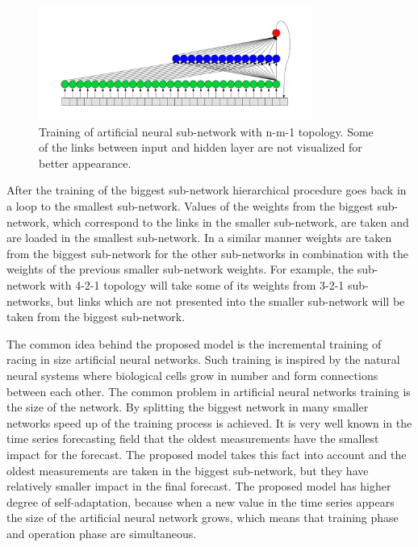 \documentclass[11pt]{article}
\begin{document}
\begin{figure}[ht!]
   \centering
     \includegraphics[width=0.8\textwidth]{pic03}
    \caption {Training of artificial neural sub-network with n-m-1 topology. Some of the links between input and hidden layer are not visualized for better appearance.}
\label{fig:pic03}
\end{figure}
\FloatBarrier

After the training of the biggest sub-network hierarchical procedure goes back in a loop to the smallest sub-network. Values of the weights from the biggest sub-network, which correspond to the links in the smaller sub-network, are taken and are loaded in the smallest sub-network. In a similar manner weights are taken from the biggest sub-network for the other sub-networks in combination with the weights of the previous smaller sub-network weights. For example, the sub-network with 4-2-1 topology will take some of its weights from 3-2-1 sub-networks, but links which are not presented into the smaller sub-network will be taken from the biggest sub-network. 

The common idea behind the proposed model is the incremental training of racing in size artificial neural networks. Such training is inspired by the natural neural systems where biological cells grow in number and form connections between each other. The common problem in artificial neural networks training is the size of the network. By splitting the biggest network in many smaller networks speed up of the training process is achieved. It is very well known in the time series forecasting field that the oldest measurements have the smallest impact for the forecast. The proposed model takes this fact into account and the oldest measurements are taken in the biggest sub-network, but they have relatively smaller impact in the final forecast. The proposed model has higher degree of self-adaptation, because when a new value in the time series appears the size of the artificial neural network grows, which means that training phase and operation phase are simultaneous.
\end{document}
